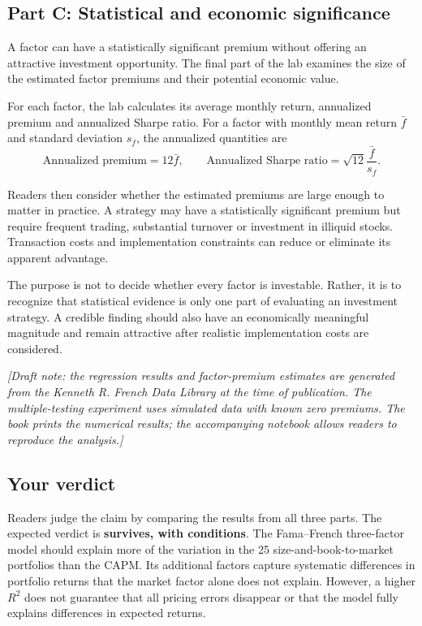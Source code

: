 \subsection*{Part C: Statistical and economic significance}

A factor can have a statistically significant premium without offering an attractive investment opportunity. The final part of the lab examines the size of the estimated factor premiums and their potential economic value.

For each factor, the lab calculates its average monthly return, annualized premium and annualized Sharpe ratio. For a factor with monthly mean return $\bar{f}$ and standard deviation $s_f$, the annualized quantities are
\begin{equation}
  \text{Annualized premium}=12\bar{f},
  \qquad
  \text{Annualized Sharpe ratio}
  =\sqrt{12}\frac{\bar{f}}{s_f}.
  \label{eq:03-lab-sharpe}
\end{equation}

Readers then consider whether the estimated premiums are large enough to matter in practice. A strategy may have a statistically significant premium but require frequent trading, substantial turnover or investment in illiquid stocks. Transaction costs and implementation constraints can reduce or eliminate its apparent advantage.

The purpose is not to decide whether every factor is investable. Rather, it is to recognize that statistical evidence is only one part of evaluating an investment strategy. A credible finding should also have an economically meaningful magnitude and remain attractive after realistic implementation costs are considered.

\emph{[Draft note: the regression results and factor-premium estimates are generated from the Kenneth R. French Data Library at the time of publication. The multiple-testing experiment uses simulated data with known zero premiums. The book prints the numerical results; the accompanying notebook allows readers to reproduce the analysis.]}

\subsection*{Your verdict}

Readers judge the claim by comparing the results from all three parts. The expected verdict is \textbf{survives, with conditions}. The Fama--French three-factor model should explain more of the variation in the 25 size-and-book-to-market portfolios than the CAPM. Its additional factors capture systematic differences in portfolio returns that the market factor alone does not explain. However, a higher $R^2$ does not guarantee that all pricing errors disappear or that the model fully explains differences in expected returns.

